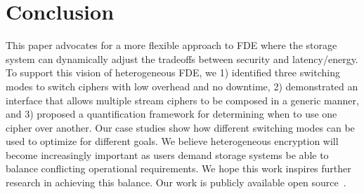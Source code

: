 \section{Conclusion}\label{sec:conclusion}

This paper advocates for a more flexible approach to FDE where the storage
system can dynamically adjust the tradeoffs between security and latency/energy.
To support this vision of heterogeneous FDE, we 1) identified three switching
modes to switch ciphers with low overhead and no downtime, 2) demonstrated an
interface that allows multiple stream ciphers to be composed in a generic
manner, and 3) proposed a quantification framework for determining when to use
one cipher over another. Our case studies show how different switching modes can
be used to optimize for different goals. We believe heterogeneous encryption
will become increasingly important as users demand storage systems be able to
balance conflicting operational requirements. We hope this work inspires further
research in achieving this balance. Our work is publicly available open
source~.

